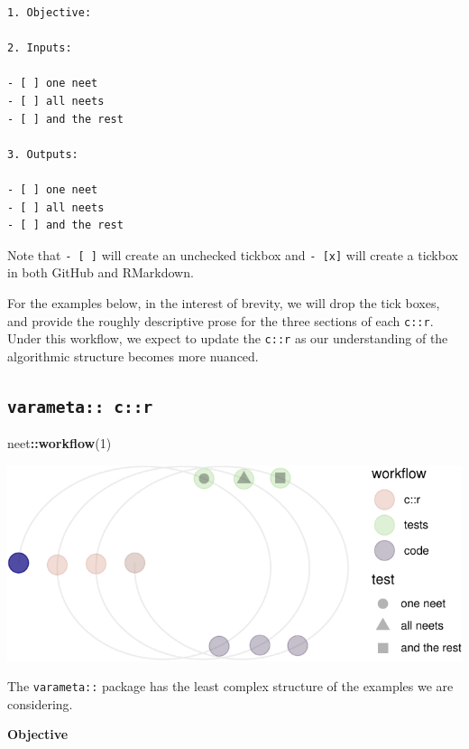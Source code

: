 \documentclass[
]{article}
\newenvironment{Shaded}{\begin{snugshade}}{\end{snugshade}}
\newcommand{\DecValTok}[1]{\textcolor[rgb]{0.00,0.00,0.81}{#1}}
\newcommand{\KeywordTok}[1]{\textcolor[rgb]{0.13,0.29,0.53}{\textbf{#1}}}
\newcommand{\NormalTok}[1]{#1}
\newcommand{\OperatorTok}[1]{\textcolor[rgb]{0.81,0.36,0.00}{\textbf{#1}}}
\begin{document}
\begin{verbatim}
1. Objective:

2. Inputs:

- [ ] one neet
- [ ] all neets
- [ ] and the rest

3. Outputs:

- [ ] one neet
- [ ] all neets
- [ ] and the rest
\end{verbatim}

Note that \texttt{-\ {[}\ {]}} will create an unchecked tickbox and \texttt{-\ {[}x{]}} will create a tickbox in both GitHub and RMarkdown.

For the examples below, in the interest of brevity, we will drop the tick boxes, and provide the roughly descriptive prose for the three sections of each \texttt{c::r}. Under this workflow, we expect to update the \texttt{c::r} as our understanding of the algorithmic structure becomes more nuanced.

\hypertarget{varameta-cr}{%
\subsection{\texorpdfstring{\texttt{varameta::\ c::r}}{varameta:: c::r}}\label{varameta-cr}}

\begin{Shaded}
\begin{Highlighting}[]
\NormalTok{neet}\OperatorTok{::}\KeywordTok{workflow}\NormalTok{(}\DecValTok{1}\NormalTok{)}
\end{Highlighting}
\end{Shaded}

\begin{center}\includegraphics{when-is-done-done_files/figure-latex/unnamed-chunk-5-1} \end{center}

The \texttt{varameta::} package has the least complex structure of the examples we are considering.

\textbf{Objective}
\end{document}
